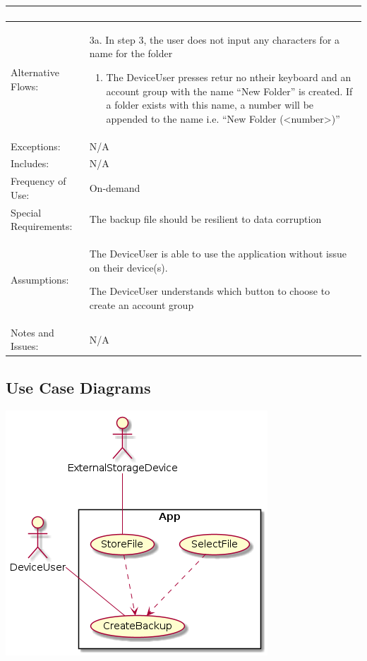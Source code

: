 \documentclass[stu]{apa7}
\newcommand{\nextitem}{\par\hspace*{\labelsep}\textbullet\hspace*{\labelsep}}
\newcommand{\nextitemblank}{\par\hspace*{\labelsep}\hspace*{\labelsep}}
\begin{document}
{{\begin{xltabular}{\textwidth}{|l|X|}
\begin{enumerate}
    \end{enumerate} \\ \hline

  Alternative Flows: &
                       \nextitemblank 3a. In step 3, the user does not input any characters for a name for the folder
                       \begin{enumerate}
                               \item The DeviceUser presses retur no ntheir keyboard and an account group with the name ``New Folder'' is created. If a folder exists with this name, a number will be appended to the name i.e. ``New Folder (<number>)''
                       \end{enumerate}
              \\ \hline

  Exceptions: &
                N/A
              \\ \hline
  Includes: & N/A \\ \hline

  Frequency of Use: & On-demand \\ \hline

  Special Requirements: & \nextitem The backup file should be resilient to data corruption \\ \hline

  Assumptions: & \nextitem The DeviceUser is able to use the application without issue on their device(s). \nextitem The DeviceUser understands which button to choose to create an account group \\ \hline

  Notes and Issues: & N/A \\ \hline

\end{xltabular}

\subsection{Use Case Diagrams}

\includegraphics[scale=0.5]{diag/gt/uc1.png}

}}
\end{document}
